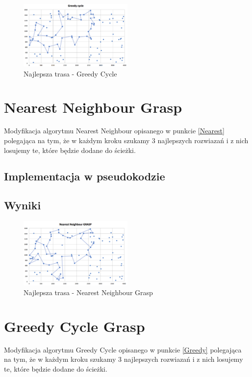 \documentclass[a4paper 10pt]{article}
\begin{document}
\begin{figure} [H]
\centering
\includegraphics[angle=0,width = 0.5\textwidth, height=!]{images/GC.png}
\caption{Najlepsza trasa - Greedy Cycle}
\label{Rys. NN}
\end{figure}

\section{Nearest Neighbour Grasp}
Modyfikacja algorytmu Nearest Neighbour opisanego w punkcie \ref{Nearest} polegająca na tym, że w każdym kroku szukamy 3 najlepszych rozwiazań i z nich losujemy te, które będzie dodane do ścieżki.
\subsection{Implementacja w pseudokodzie}
\subsection{Wyniki}

\begin{figure} [H]
\centering
\includegraphics[angle=0,width = 0.5\textwidth, height=!]{images/NNG.png}
\caption{Najlepsza trasa - Nearest Neighbour Grasp}
\label{Rys. NNG}
\end{figure}
\section{Greedy Cycle Grasp}
Modyfikacja algorytmu Greedy Cycle opisanego w punkcie \ref{Greedy} polegająca na tym, że w każdym kroku szukamy 3 najlepszych rozwiazań i z nich losujemy te, które będzie dodane do ścieżki.
\end{document}
